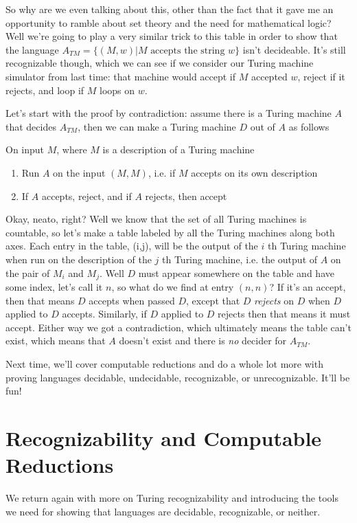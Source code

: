 \documentclass[11pt]{article}
\begin{document}
So why are we even talking about this, other than the fact that it gave me an opportunity to ramble about set theory and the need for mathematical logic? Well we're going to play a very similar trick to this table in order to show that the language $A_{TM} = \{(M,w) | M \text{ accepts the string } w\}$ isn't decideable. It's still recognizable though, which we can see if we consider our Turing machine simulator from last time: that machine would accept if $M$ accepted $w$, reject if it rejects, and loop if $M$ loops on $w$. 

Let's start with the proof by contradiction: assume there is a Turing machine $A$ that decides $A_{TM}$, then we can make a Turing machine $D$ out of $A$ as follows 

On input $M$, where $M$ is a description of a Turing machine

\begin{enumerate}
\item Run $A$ on the input $(M,M)$, i.e. if $M$ accepts on its own description
\item If $A$ accepts, reject, and if $A$ rejects, then accept
\end{enumerate}

Okay, neato, right? Well we know that the set of all Turing machines is countable, so let's make a table labeled by all the Turing machines along both axes. Each entry in the table, (i,j), will be the output of the $i$ th Turing machine when run on the description of the $j$ th Turing machine, i.e. the output of $A$ on the pair of $M_i$ and $M_j$. Well $D$ must appear somewhere on the table and have some index, let's call it $n$, so what do we find at entry $(n,n)$? If it's an accept, then that means $D$ accepts when passed $D$, except that $D$ \emph{rejects} on $D$ when $D$ applied to $D$ accepts. Similarly, if $D$ applied to $D$ rejects then that means it must accept. Either way we got a contradiction, which ultimately means the table can't exist, which means that $A$ doesn't exist and there is \emph{no} decider for $A_{TM}$.

Next time, we'll cover computable reductions and do a whole lot more with proving languages decidable, undecidable, recognizable, or unrecognizable. It'll be fun!
\section{Recognizability and Computable Reductions}
\label{sec-15}
We return again with more on Turing recognizability and introducing the tools we need for showing that languages are decidable, recognizable, or neither.
\end{document}
